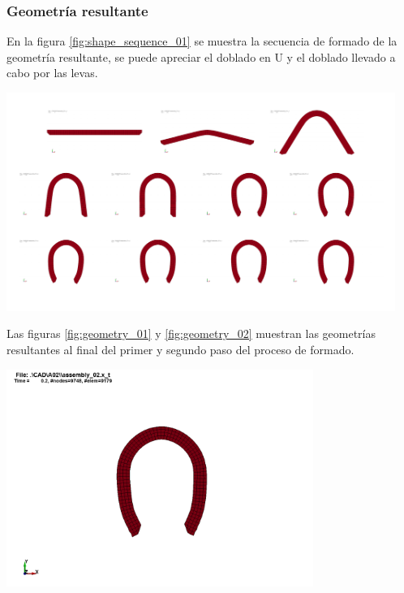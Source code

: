 \subsubsection{Geometría resultante}

En la figura \ref{fig:shape_sequence_01} se muestra la secuencia de formado 
de la geometría resultante, se puede apreciar el doblado en U y el doblado 
llevado a cabo por las levas.

\begin{center}
\includegraphics[width=0.95\textwidth]{src/ch4/shape_sequence_01.pdf}
\label{fig:shape_sequence_01}
\end{center}

Las figuras \ref{fig:geometry_01} y \ref{fig:geometry_02} muestran las geometrías 
resultantes al final del primer y segundo paso del proceso de formado.

\begin{center}
\includegraphics[width=0.75\textwidth]{src/ch4/geometry_01.png}
\label{fig:geometry_01}
\end{center}

